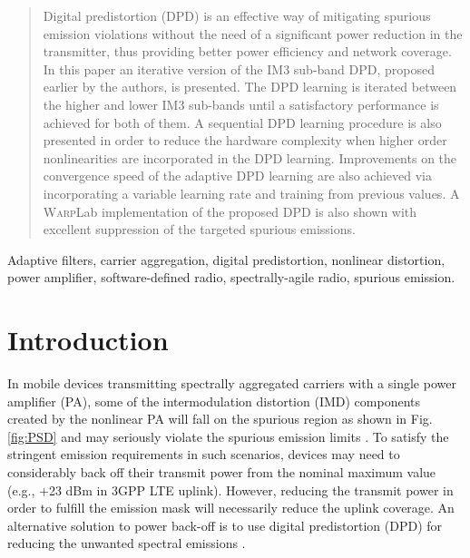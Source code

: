 \documentclass[9pt,conference]{IEEEtran}
\begin{document}
\begin{spacing}{0.88}
\begin{abstract}
Digital predistortion (DPD) is an effective way of mitigating spurious emission violations without the need of a significant power reduction in the transmitter, thus providing better power efficiency and network coverage. In this paper an iterative version of the IM3 sub-band DPD, proposed earlier by the authors, is presented. The DPD learning is iterated between the higher and lower IM3 sub-bands until a satisfactory performance is achieved for both of them. A sequential DPD learning procedure is also presented in order to reduce the hardware complexity when higher order nonlinearities are incorporated in the DPD learning. Improvements on the convergence speed of the adaptive DPD learning are also achieved via incorporating a variable learning rate and training from previous values. A \textsc{Warp}Lab implementation of the proposed DPD is also shown with excellent suppression of the targeted spurious emissions. 
\end{abstract}

\begin{IEEEkeywords}
Adaptive filters, carrier aggregation, digital predistortion, nonlinear distortion, power amplifier, software-defined radio, spectrally-agile radio, spurious emission. 
\end{IEEEkeywords}

\section{Introduction}
In mobile devices transmitting spectrally aggregated carriers with a single power amplifier (PA), some of the intermodulation distortion (IMD) components created by the nonlinear PA will fall on the spurious region as shown in Fig. \ref{fig:PSD} and may seriously violate the spurious emission limits \cite{Commag_abdelaziz,3GPP_CA_Emissions_1,3GPP_CA_Emissions_2,LaehteensuoMay2013}. To satisfy the stringent emission requirements in such scenarios, devices may need to considerably back off their transmit power from the nominal maximum value (e.g., +23 dBm in 3GPP LTE uplink). However, reducing the transmit power in order to fulfill the emission mask will necessarily reduce the uplink coverage. An alternative solution to power back-off is to use digital predistortion (DPD) for reducing the unwanted spectral emissions \cite{P.RoblinJan.2008,J.KimJan.2013,S.A.BassamAug.2012,ICASSP2014,Commag_abdelaziz}. 


\end{spacing}
\end{document}
